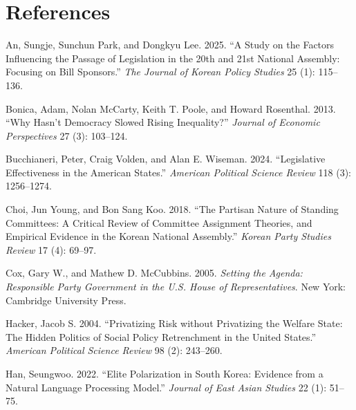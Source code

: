 \documentclass[11pt]{article}
\begin{document}
\section*{References}


\begin{description}

\item An, Sungje, Sunchun Park, and Dongkyu Lee. 2025. ``A Study on the Factors Influencing the Passage of Legislation in the 20th and 21st National Assembly: Focusing on Bill Sponsors.'' \textit{The Journal of Korean Policy Studies} 25 (1): 115--136.

\item Bonica, Adam, Nolan McCarty, Keith T. Poole, and Howard Rosenthal. 2013. ``Why Hasn't Democracy Slowed Rising Inequality?'' \textit{Journal of Economic Perspectives} 27 (3): 103--124.

\item Bucchianeri, Peter, Craig Volden, and Alan E. Wiseman. 2024. ``Legislative Effectiveness in the American States.'' \textit{American Political Science Review} 118 (3): 1256--1274.

\item Choi, Jun Young, and Bon Sang Koo. 2018. ``The Partisan Nature of Standing Committees: A Critical Review of Committee Assignment Theories, and Empirical Evidence in the Korean National Assembly.'' \textit{Korean Party Studies Review} 17 (4): 69--97.

\item Cox, Gary W., and Mathew D. McCubbins. 2005. \textit{Setting the Agenda: Responsible Party Government in the U.S. House of Representatives}. New York: Cambridge University Press.

\item Hacker, Jacob S. 2004. ``Privatizing Risk without Privatizing the Welfare State: The Hidden Politics of Social Policy Retrenchment in the United States.'' \textit{American Political Science Review} 98 (2): 243--260.

\item Han, Seungwoo. 2022. ``Elite Polarization in South Korea: Evidence from a Natural Language Processing Model.'' \textit{Journal of East Asian Studies} 22 (1): 51--75.


\end{description}
\end{document}
